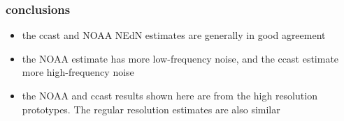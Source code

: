 \documentclass[11pt]{beamer}
\begin{document}
\begin{frame}
\frametitle{conclusions}

\begin{itemize}

  \item the ccast and NOAA NEdN estimates are generally in good
    agreement 

  \item the NOAA estimate has more low-frequency noise, and the
    ccast estimate more high-frequency noise

  \item the NOAA and ccast results shown here are from the high
    resolution prototypes.  The regular resolution estimates are
    also similar
\end{itemize}

\end{frame}
\end{document}
